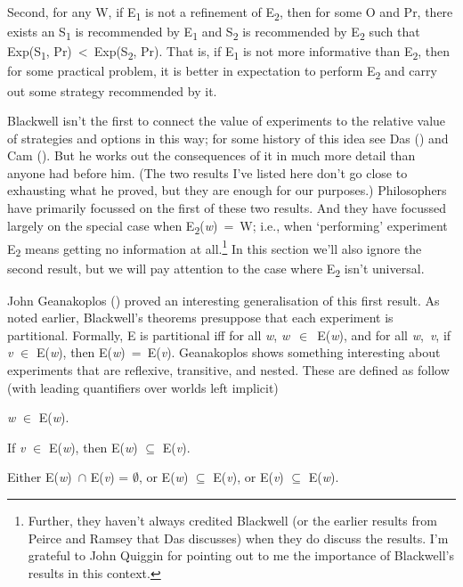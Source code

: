 \documentclass[
  12pt,
  letterpaper,
  DIV=11,
  numbers=noendperiod]{scrartcl}
\providecommand{\tightlist}{%
  \setlength{\itemsep}{0pt}\setlength{\parskip}{0pt}}\usepackage{longtable,booktabs,array}
\begin{document}
Second, for any W, if E\textsubscript{1} is not a refinement of
E\textsubscript{2}, then for some O and Pr, there exists an
S\textsubscript{1} is recommended by E\textsubscript{1} and
S\textsubscript{2} is recommended by E\textsubscript{2} such that
Exp(S\textsubscript{1}, Pr)~\textless~Exp(S\textsubscript{2}, Pr). That
is, if E\textsubscript{1} is not more informative than
E\textsubscript{2}, then for some practical problem, it is better in
expectation to perform E\textsubscript{2} and carry out some strategy
recommended by it.

Blackwell isn't the first to connect the value of experiments to the
relative value of strategies and options in this way; for some history
of this idea see Das () and Cam
(). But he works out the consequences of
it in much more detail than anyone had before him. (The two results I've
listed here don't go close to exhausting what he proved, but they are
enough for our purposes.) Philosophers have primarily focussed on the
first of these two results. And they have focussed largely on the
special case when E\textsubscript{2}(\emph{w})~=~W; i.e., when
`performing' experiment E\textsubscript{2} means getting no information
at all.\footnote{Further, they haven't always credited Blackwell (or the
  earlier results from Peirce and Ramsey that Das discusses) when they
  do discuss the results. I'm grateful to John Quiggin for pointing out
  to me the importance of Blackwell's results in this context.} In this
section we'll also ignore the second result, but we will pay attention
to the case where E\textsubscript{2} isn't universal.

John Geanakoplos ()
proved an interesting generalisation of this first result. As noted
earlier, Blackwell's theorems presuppose that each experiment is
partitional. Formally, E is partitional iff for all \emph{w},
\emph{w}~$\in$~E(\emph{w}), and for all \emph{w},~\emph{v}, if \emph{v} $\in$
E(\emph{w}), then E(\emph{w})~=~E(\emph{v}). Geanakoplos shows something
interesting about experiments that are reflexive, transitive, and
nested. These are defined as follow (with leading quantifiers over
worlds left implicit)

\begin{description}
\tightlist
\item[Reflexive]
\emph{w} $\in$ E(\emph{w}).
\item[Transitive]
If \emph{v} $\in$ E(\emph{w}), then E(\emph{w}) $\subseteq$ E(\emph{v}).
\item[Nested]
Either E(\emph{w})~$\cap$ E(\emph{v}) = $\emptyset$, or E(\emph{w}) $\subseteq$ E(\emph{v}), or
E(\emph{v}) $\subseteq$ E(\emph{w}).
\end{description}
\end{document}
